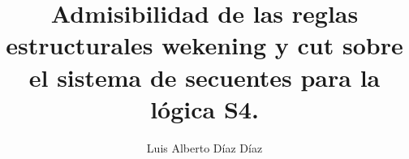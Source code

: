 \documentclass[12pt,twoside,a4paper]{report}
\begin{document}
\title{Admisibilidad de las reglas estructurales wekening y cut sobre el sistema de secuentes para la lógica S4.}

\author{Luis Alberto Díaz Díaz}

\maketitle
{}


\end{document}
